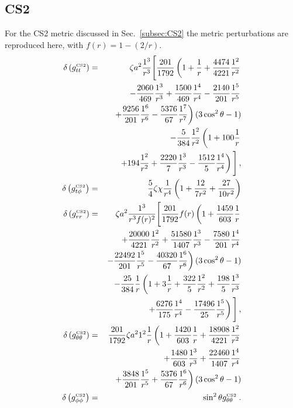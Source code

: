 \subsection{CS2}\label{subsec:CS2components}
For the CS2 metric discussed in Sec.\ \ref{subsec:CS2} the metric perturbations are reproduced here, with $f(r)=1-(2/r)$.
\begin{eqnarray}
\delta\left(g_{tt}^{\mbox{\tiny CS2}} \right) &=& \zeta a^2 \frac{1^3}{r^3} \Bigg[  \frac{201}{1792} \left( 1+\frac{1}{r} +\frac{4474}{4221} \frac{1^2}{r^2} \right.\nonumber\\
&&\left.-\frac{2060}{469} \frac{1^3}{r^3}+\frac{1500}{469} \frac{1^4}{r^4} - \frac{2140}{201} \frac{1^5}{r^5}  \right.\nonumber \\
&&\left.+ \frac{9256}{201} \frac{1^6}{r^6}- \frac{5376}{67} \frac{1^7}{r^7}  \right) (3\cos^2 \theta -1)  \nonumber \\
&&- \frac{5}{384} \frac{1^2}{r^2} \left( 1 + 100 \frac{1}{r} \right.\nonumber\\
&&\left.+ 194\frac{1^2}{r^2} + \frac{2220}{7} \frac{1^3}{r^3} - \frac{1512}{5} \frac{1^4}{r^4} \right) \Bigg]    \,, 
\\
\delta\left(g_{t\phi}^{\mbox{\tiny CS2}} \right) &=& \frac{5}{4}\zeta\chi\frac{1}{r^{4}}\left(1+\frac{12}{7r^{2}}+\frac{27}{10r^{2}}\right)
\\
\delta\left(g_{rr}^{\mbox{\tiny CS2}} \right) &=&   \zeta a^2 \frac{1^3}{r^3 f(r)^2} \Bigg[  \frac{201}{1792}  f(r) \left( 1+ \frac{1459}{603} \frac{1}{r} \right.\nonumber\\
&&\left. +\frac{20000}{4221} \frac{1^2}{r^2}+\frac{51580}{1407} \frac{1^3}{r^3} -\frac{7580}{201} \frac{1^4}{r^4} \right. \nonumber \\ 
& & \left. - \frac{22492}{201} \frac{1^5}{r^5}  - \frac{40320}{67} \frac{1^6}{r^6} \right) (3 \cos^2 \theta -1)   \nonumber \\
& & - \frac{25}{384} \frac{1}{r} \left( 1 + 3\frac{1}{r} + \frac{322}{5} \frac{1^2}{r^2} + \frac{198}{5} \frac{1^3}{r^3} \right.\nonumber\\
&&\left.+ \frac{6276}{175} \frac{1^4}{r^4} - \frac{17496}{25} \frac{1^5}{r^5}   \right) \Bigg]  \,,
\\
\delta\left(g_{\theta\theta}^{\mbox{\tiny CS2}} \right) &=& \frac{201}{1792} \zeta a^2 1^2 \frac{1}{r} \left( 1 + \frac{1420}{603} \frac{1}{r} + \frac{18908}{4221} \frac{1^2}{r^2} \right. \nonumber \\
& & \left. + \frac{1480}{603} \frac{1^3}{r^3}+ \frac{22460}{1407} \frac{1^4}{r^4} \right.\nonumber\\
&&\left.+ \frac{3848}{201} \frac{1^5}{r^5} + \frac{5376}{67} \frac{1^6}{r^6} \right) (3 \cos^2 \theta -1)
\\
\delta\left(g_{\phi\phi}^{\mbox{\tiny CS2}} \right) &=&  \sin^2 \theta g_{\theta\theta}^{\mbox{\tiny CS2}} \; .
\end{eqnarray}

